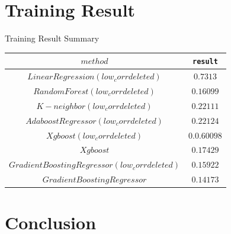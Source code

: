 \documentclass[
size=14pt,
paper=smartboard,  %
mode=present, 		%
display=slides, 	%
style=tuliplab,  	%
pauseslide,
fleqn,leqno]{powerdot}
\begin{document}
	\section{Training Result}
	\begin{slide}[toc=,bm=]{Training Result Summary}
			\begin{center}
				\begin{tabular}{c c }
					\toprule
					$method$ & \texttt{result}  \\
					\midrule
					$Linear Regression (low_corr deleted)$ &  {$0.7313$}   \\
					$Random Forest(low_corr deleted)$ &  {$0.16099$}   \\
					$K-neighbor(low_corr deleted)$ &  {$0.22111$}   \\
					$Adaboost Regressor(low_corr deleted)$ &  {$0.22124$}    \\
					$Xgboost(low_corr deleted)$ &  {$0.0.60098$}    \\
					$Xgboost$ &  {$0.17429$}    \\
					$Gradient Boosting Regressor(low_corr deleted)$ &  {$0.15922$}    \\
					$Gradient Boosting Regressor$ &  {$0.14173$}     \\
					\bottomrule
				\end{tabular}
			\end{center}
	\end{slide}
	\section{Conclusion}
\end{document}
